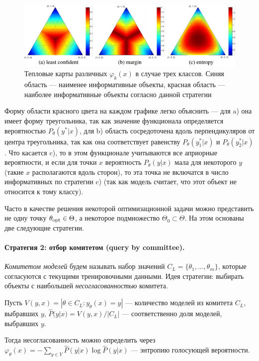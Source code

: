 \documentclass[specialist, 12pt, href]{article}
\begin{document}
\begin{figure}[htbp]
\centering
\includegraphics[width=6in]{img/hm.jpg}
\caption{Тепловые карты различных \(\varphi_k(x)\) в случае трех
классов. Синяя область --- наименее информативные объекты, красная
область --- наиболее информативные объекты согласно данной стратегии}
\end{figure}

Форму области красного цвета на каждом графике легко объяснить --- для
a) она имеет форму треугольника, так как значение функционала
определяется вероятностью \(P_{\theta}(y^*|x)\), для b) область
сосредоточена вдоль перпендикуляров от центра треугольника, так как она
соответствует равенству \(P_{\theta}(y^*_1|x)\) и
\(P_{\theta}(y^*_2|x)\). Что касается c), то в этом функционале
учитываются все априорные вероятности, и если для точки \(x\)
вероятность \(P_{\theta}(y|x)\) мала для некоторого \(y\) (такие \(x\)
располагаются вдоль сторон), то эта точка не включатся в число
информативных по стратегии c) (так как модель считает, что этот объект
не относится к тому классу).

Часто в качестве решения некоторой оптимизационной задачи можно представить не одну точку $\theta_{\rm opt} \in \Theta$, а некоторое подмножество $\Theta_0 \subset \Theta$. На этом основаны две следующие стратегии.

\paragraph{Стратегия 2: отбор комитетом (query by
committee).}

\emph{Комитетом моделей} будем называть набор значений \(C_L = \{\theta_1,\ldots,\theta_m\}\), которые согласуются с текущими тренировочными
данными. Идея стратегии: выбирать объекты
с наибольшей \emph{несогласованностью} комитета.

Пусть
\(V(y, x) = |{\theta \in C_{L}: y_{\theta}(x) = y}|\) --- количество
  моделей из комитета \(C_{L}\), выбравших \(y\),  \(\hat{P}(y|x) = V(y, x) / |C_{L}|\) --- соответственно доля моделей,
  выбравших \(y\).

Тогда несогласованность можно определить через
\(\varphi_{\theta}(x) = - \sum_{y \in Y} \hat{P}(y|x) \log \hat{P}(y|x)\)
--- энтропию голосующей вероятности.
\end{document}
